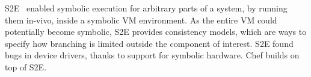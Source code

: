 S2E~\cite{s2eSystem} enabled symbolic execution for arbitrary parts of a system, by running them in-vivo, inside a symbolic VM environment.  As the entire VM could potentially become symbolic, S2E provides consistency models, which are ways to specify how branching is limited outside the component of interest.  S2E found bugs in device drivers, thanks to support for symbolic hardware.
%
Chef builds on top of S2E.















